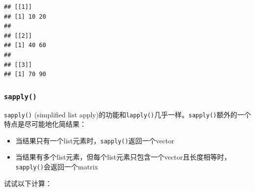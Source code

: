 \documentclass[]{book}
\providecommand{\tightlist}{%
  \setlength{\itemsep}{0pt}\setlength{\parskip}{0pt}}
\begin{document}
\begin{verbatim}
## [[1]]
## [1] 10 20
## 
## [[2]]
## [1] 40 60
## 
## [[3]]
## [1] 70 90
\end{verbatim}

\hypertarget{sapply}{%
\subsubsection{\texorpdfstring{\texttt{sapply()}}{sapply()}}\label{sapply}}

\texttt{sapply()} (simplified list apply)的功能和\texttt{lapply()}几乎一样。\texttt{sapply()}额外的一个特点是尽可能地化简结果：

\begin{itemize}
\tightlist
\item
  当结果只有一个list元素时，\texttt{sapply()}返回一个vector
\item
  当结果有多个list元素，但每个list元素只包含一个vector且长度相等时，\texttt{sapply()}会返回一个matrix
\end{itemize}

试试以下计算：
\end{document}
